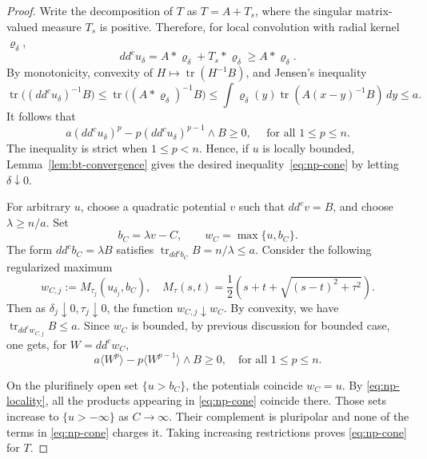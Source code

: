 \documentclass[reqno]{amsart}
\numberwithin{equation}{section}
\theoremstyle{definition}
\DeclareMathOperator{\tr}{tr}
\newcommand{\ddc}{dd^c}
\begin{document}
\begin{proof}
    Write the decomposition of $T$ as $T=A+T_s$, where the singular matrix-valued measure $T_s$ is positive. Therefore, for local convolution with radial kernel $\varrho_\delta$,\[
    \ddc u_\delta=A*\varrho_\delta+T_s*\varrho_\delta\geq A*\varrho_\delta.
    \]
    By monotonicity,  convexity of $H\mapsto\tr(H^{-1}B)$, and Jensen's inequality \begin{equation}\label{eq:convolved-trace}
\tr\bigl((dd^cu_\delta)^{-1}B\bigr)
\leq\tr\bigl((A*\varrho_\delta)^{-1}B\bigr)
\leq\int\varrho_\delta(y)\tr(A(x-y)^{-1}B)\,dy
\leq a. 
    \end{equation}
It follows that \[
a(\ddc u_\delta)^p-p(\ddc u_\delta)^{p-1}\wedge B\geq 0, \quad \text{ for all }1\le p\le n.
\]
The inequality is strict when $1\le p<n$. Hence, if $u$ is locally bounded, Lemma~\ref{lem:bt-convergence} gives the desired inequality~\eqref{eq:np-cone} by letting $\delta\downarrow 0$.

For arbitrary $u$, choose a quadratic potential $v$ such that $\ddc v=B$, and choose $\lambda\ge n/a$. Set \[
b_C=\lambda v-C, \qquad w_C=\max\{u,b_C\}.
\]
The form $\ddc b_C=\lambda B$ satisfies $\tr_{dd^cb_C}B=n/\lambda\le a$. Consider the following regularized maximum \[
w_{C,j}:=M_{\tau_j}(u_{\delta_j},b_C), \quad M_\tau(s,t)=\frac12(s+t+\sqrt{(s-t)^2+\tau^2}).
\]
Then as $\delta_j\downarrow 0, \tau_j\downarrow 0$, the function $w_{C,j}\downarrow w_{C}$. By convexity, we have $\tr_{dd^cw_{C,j}}B\le a$. Since $w_C$ is bounded, by previous discussion for bounded case, one gets, for $W=\ddc w_C$, \[
a\langle W^p\rangle-p\langle W^{p-1}\rangle\wedge B\geq 0, \quad \text{for all }1\leq p\leq n.
\]

On the plurifinely open set $\{u>b_C\}$, the potentials coincide $w_C=u$. By \eqref{eq:np-locality}, all the products appearing in \eqref{eq:np-cone} coincide there. Those sets increase to $\{u>-\infty\}$ as $C\to \infty$. Their complement is pluripolar and none of the terms in \eqref{eq:np-cone} charges it. Taking increasing restrictions proves \eqref{eq:np-cone} for $T$.  
    
\end{proof}
\end{document}
